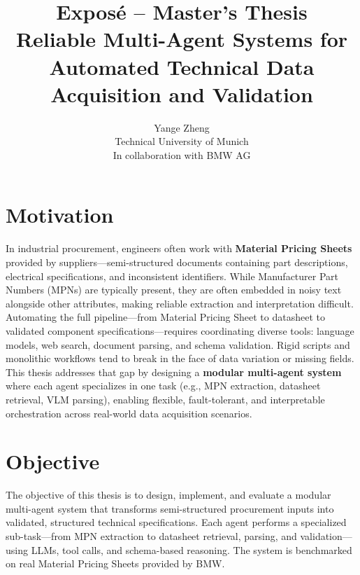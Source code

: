 \documentclass[11pt]{article}
\title{\textbf{Exposé – Master's Thesis}\\Reliable Multi-Agent Systems for Automated Technical Data Acquisition and Validation}
\author{Yange Zheng\\Technical University of Munich\\In collaboration with BMW AG}
\date{}
\begin{document}
\maketitle

\section*{Motivation}
In industrial procurement, engineers often work with \textbf{Material Pricing Sheets} provided by suppliers—semi-structured documents containing part descriptions, electrical specifications, and inconsistent identifiers. While Manufacturer Part Numbers (MPNs) are typically present, they are often embedded in noisy text alongside other attributes, making reliable extraction and interpretation difficult. Automating the full pipeline—from Material Pricing Sheet to datasheet to validated component specifications—requires coordinating diverse tools: language models, web search, document parsing, and schema validation. Rigid scripts and monolithic workflows tend to break in the face of data variation or missing fields. This thesis addresses that gap by designing a \textbf{modular multi-agent system} where each agent specializes in one task (e.g., MPN extraction, datasheet retrieval, VLM parsing), enabling flexible, fault-tolerant, and interpretable orchestration across real-world data acquisition scenarios.

\section*{Objective}
The objective of this thesis is to design, implement, and evaluate a modular multi-agent system that transforms semi-structured procurement inputs into validated, structured technical specifications. Each agent performs a specialized sub-task—from MPN extraction to datasheet retrieval, parsing, and validation—using LLMs, tool calls, and schema-based reasoning. The system is benchmarked on real Material Pricing Sheets provided by BMW.
\end{document}

